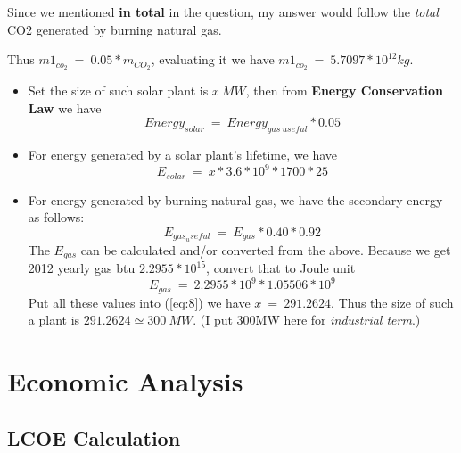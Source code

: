 \documentclass[12pt]{article}
\begin{document}
Since we mentioned \textbf{in total} in the question, my answer would
follow the \emph{total} CO2 generated by burning natural gas.
\par
Thus $m1_{co_{2}}~=~0.05 * m_{CO_{2}}$, evaluating it we have
$m1_{co_{2}}~=~5.7097 * 10^{12} kg$.
\begin{itemize}
\item Set the size of such solar plant is $x~MW$, then from
  \textbf{Energy Conservation Law} we have
  \begin{equation}
    \label{eq:8}
    Energy_{solar}~=~Energy_{gas~useful} * 0.05
  \end{equation}
\item For energy generated by a solar plant's lifetime, we have 
  \begin{equation}
    \label{eq:9}
    E_{solar}~=~x * 3.6 * 10^{9} * 1700 * 25
  \end{equation}
\item For energy generated by burning natural gas, we have the
  secondary energy as follows:
  \begin{equation}
    \label{eq:10}
    E_{gas_useful}~=~E_{gas} * 0.40 * 0.92
  \end{equation}
  The $E_{gas}$ can be calculated and/or converted from the
  above. Because we get 2012 yearly gas btu $2.2955 * 10^{15}$,
  convert that to Joule unit
  \begin{equation}
    \label{eq:11}
    E_{gas}~=~2.2955 * 10^{9} * 1.05506 * 10^{9}
  \end{equation}
  Put all these values into (\ref{eq:8}) we have $x~=~291.2624$. Thus
  the size of such a plant is $291.2624\simeq 300~MW$. (I put 300MW
  here for \emph{industrial term}.)
\end{itemize}


\section{Economic Analysis}
\label{sec:economic-analysis}


\subsection{LCOE Calculation}
\label{sec:lcoe-calculation}
\end{document}
